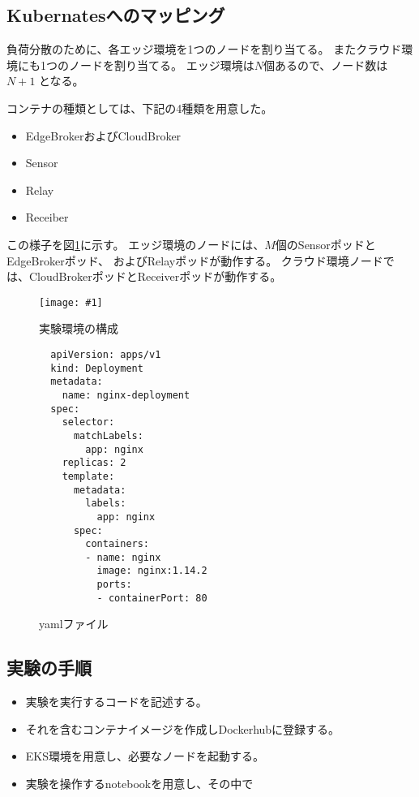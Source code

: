 \documentclass[submit,techrep]{ipsj}
\newcommand{\reffig}[1]{図\ref{#1}}
\newcommand{\epsfig}[4]{
\begin{figure}[tb]
  \begin{center}
    \texttt{[image: \#1]}
  \end{center}
  \caption{#3}
  \label{#4}
\end{figure}}
\newcommand{\kbs}{Kubernates}
\begin{document}
\subsection{\kbs へのマッピング}

負荷分散のために、各エッジ環境を1つのノードを割り当てる。
またクラウド環境にも1つのノードを割り当てる。
エッジ環境は$N$個あるので、ノード数は $N+1$ となる。

コンテナの種類としては、下記の4種類を用意した。
\begin{itemize}
  \item EdgeBrokerおよびCloudBroker
  \item Sensor 
  \item Relay
  \item Receiber
\end{itemize}

この様子を\reffig{setup}に示す。
エッジ環境のノードには、$M$個のSensorポッドとEdgeBrokerポッド、
およびRelayポッドが動作する。
クラウド環境ノードでは、CloudBrokerポッドとReceiverポッドが動作する。

\epsfig{figs/experimental-setup.pdf}{width=8.5cm}{実験環境の構成}{setup}



\begin{figure}[tbp]
\renewcommand{\baselinestretch}{0.8}
\begin{lstlisting}
  apiVersion: apps/v1 
  kind: Deployment
  metadata:
    name: nginx-deployment
  spec:
    selector:
      matchLabels:
        app: nginx
    replicas: 2 
    template:
      metadata:
        labels:
          app: nginx
      spec:
        containers:
        - name: nginx
          image: nginx:1.14.2
          ports:
          - containerPort: 80
\end{lstlisting}
\caption{yamlファイル}
\label{yaml}
\end{figure}




\subsection{実験の手順}
\begin{itemize}
  \item 実験を実行するコードを記述する。
  \item それを含むコンテナイメージを作成しDockerhubに登録する。
  \item EKS環境を用意し、必要なノードを起動する。
  \item 実験を操作するnotebookを用意し、その中で
\end{itemize}
\end{document}
